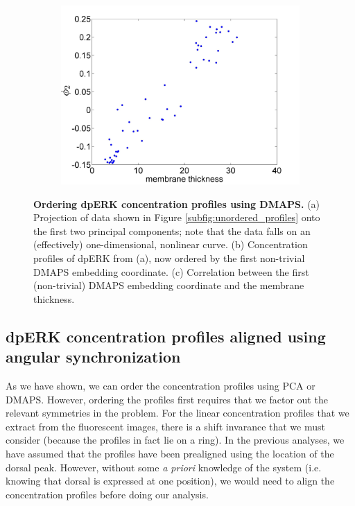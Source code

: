 \documentclass[10pt]{article}
\begin{document}
\begin{figure}[H]
\begin{subfigure}{0.3\textwidth}
\includegraphics[width=\textwidth]{DMAPS_time_corr}
\caption{}
\end{subfigure}
\caption{{\bf Ordering dpERK concentration profiles using DMAPS.} (a) Projection of data shown in Figure \ref{subfig:unordered_profiles} onto the first two principal components; note that the data falls on an (effectively) one-dimensional, nonlinear curve. 
(b) Concentration profiles of dpERK from (a), now ordered by the first non-trivial DMAPS embedding coordinate.
(c) Correlation between the first (non-trivial) DMAPS embedding coordinate and the membrane thickness.}
\label{fig:DMAPS_ordering}
\end{figure}

\subsection*{dpERK concentration profiles aligned using angular synchronization}

As we have shown, we can order the concentration profiles using PCA or DMAPS.
%
However, ordering the profiles first requires that we factor out the relevant symmetries in the problem.
%
For the linear concentration profiles that we extract from the fluorescent images, there is a shift invarance that we must consider (because the profiles in fact lie on a ring).
%
In the previous analyses, we have assumed that the profiles have been prealigned using the location of the dorsal peak.
%
However, without some {\em a priori} knowledge of the system (i.e. knowing that dorsal is expressed at one position), we would need to align the concentration profiles before doing our analysis.
\end{document}
